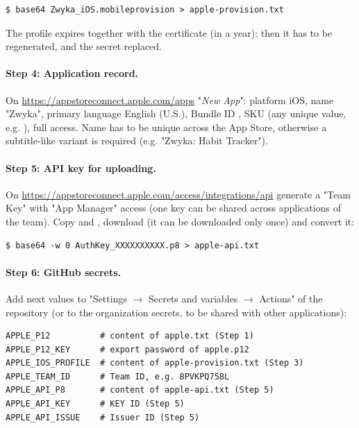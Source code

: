 \begin{lstlisting}[language=terminal]
$ base64 Zwyka_iOS.mobileprovision > apple-provision.txt
\end{lstlisting}

\noindent The profile expires together with the certificate (in a year): then it has to be regenerated, and the secret
replaced.

\paragraph{Step 4: Application record.} On \href{https://appstoreconnect.apple.com/apps}{https://appstoreconnect.apple.com/apps}
"\emph{New App}": platform iOS, name "Zwyka", primary language English (U.S.), Bundle ID , SKU
(any unique value, e.g. ), full access. Name has to be unique across the App Store, otherwise a subtitle-like
variant is required (e.g. "Zwyka: Habit Tracker").

\paragraph{Step 5: API key for uploading.} On
\href{https://appstoreconnect.apple.com/access/integrations/api}{https://appstoreconnect.apple.com/access/integrations/api}
generate a "Team Key" with "App Manager" access (one key can be shared across applications of the team). Copy
 and , download  (it can be downloaded only once) and convert it:

\begin{lstlisting}[language=terminal]
$ base64 -w 0 AuthKey_XXXXXXXXXX.p8 > apple-api.txt
\end{lstlisting}

\paragraph{Step 6: GitHub secrets.} Add next values to "Settings $\rightarrow$ Secrets and variables $\rightarrow$
Actions" of the repository (or to the organization secrets, to be shared with other applications):

\begin{lstlisting}[language=terminal]
APPLE_P12          # content of apple.txt (Step 1)
APPLE_P12_KEY      # export password of apple.p12
APPLE_IOS_PROFILE  # content of apple-provision.txt (Step 3)
APPLE_TEAM_ID      # Team ID, e.g. 8PVKPQ758L
APPLE_API_P8       # content of apple-api.txt (Step 5)
APPLE_API_KEY      # KEY ID (Step 5)
APPLE_API_ISSUE    # Issuer ID (Step 5)
\end{lstlisting}

